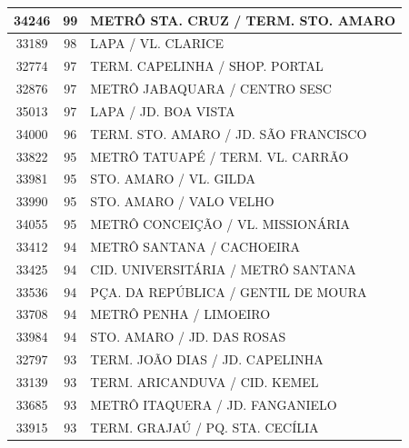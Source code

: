 \documentclass[
	12pt,				%
	oneside,			%
	a4paper,			%
	english,			%
	brazil				%
	]{abntex2ppgsi}
\begin{document}
\begin{apendicesenv}
\begin{longtable}{c|c|p{7cm}}
    34246 & 99    & METRÔ STA. CRUZ / TERM. STO. AMARO \\
\hline

    33189 & 98    & LAPA / VL. CLARICE \\
\hline

    32774 & 97    & TERM. CAPELINHA / SHOP. PORTAL \\
\hline

    32876 & 97    & METRÔ JABAQUARA / CENTRO SESC \\
\hline

    35013 & 97    & LAPA / JD. BOA VISTA \\
\hline

    34000 & 96    & TERM. STO. AMARO / JD. SÃO FRANCISCO \\
\hline

    33822 & 95    & METRÔ TATUAPÉ / TERM. VL. CARRÃO \\
\hline

    33981 & 95    & STO. AMARO / VL. GILDA \\
\hline

    33990 & 95    & STO. AMARO / VALO VELHO \\
\hline

    34055 & 95    & METRÔ CONCEIÇÃO / VL. MISSIONÁRIA \\
\hline

    33412 & 94    & METRÔ SANTANA / CACHOEIRA \\
\hline

    33425 & 94    & CID. UNIVERSITÁRIA / METRÔ SANTANA \\
\hline

    33536 & 94    & PÇA. DA REPÚBLICA / GENTIL DE MOURA \\
\hline

    33708 & 94    & METRÔ PENHA / LIMOEIRO \\
\hline

    33984 & 94    & STO. AMARO / JD. DAS ROSAS \\
\hline

    32797 & 93    & TERM. JOÃO DIAS / JD. CAPELINHA \\
\hline

    33139 & 93    & TERM. ARICANDUVA / CID. KEMEL \\
\hline

    33685 & 93    & METRÔ ITAQUERA / JD. FANGANIELO \\
\hline

    33915 & 93    & TERM. GRAJAÚ / PQ. STA. CECÍLIA \\
\hline


\end{longtable}
\end{apendicesenv}
\end{document}
